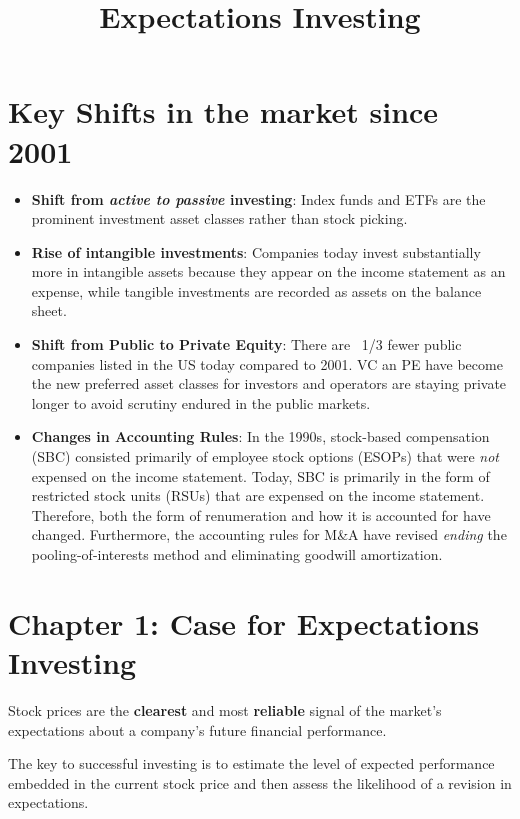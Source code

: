 \documentclass[english,titlepage]{article}
\begin{document}
\title{\textbf{Expectations Investing} \\ 
\date{}
}
\maketitle
\section{Key Shifts in the market since 2001}
\begin{itemize}
    \item \textbf{Shift from \emph{active to passive} investing}: Index funds and ETFs are the prominent investment asset classes rather than stock picking. 
    \item \textbf{Rise of intangible investments}: Companies today invest substantially more in intangible assets because they appear on the income statement as an expense, while tangible investments are recorded as assets on the balance sheet. 
    \item \textbf{Shift from Public to Private Equity}: There are ~1/3 fewer public companies listed in the US today compared to 2001. VC an PE have become the new preferred asset classes for investors and operators are staying private longer to avoid scrutiny endured in the public markets. 
    \item \textbf{Changes in Accounting Rules}: In the 1990s, stock-based compensation (SBC) consisted primarily of employee stock options (ESOPs) that were \emph{not} expensed on the income statement. 
                                                Today, SBC is primarily in the form of restricted stock units (RSUs) that are expensed on the income statement. 
                                                Therefore, both the form of renumeration and how it is accounted for have changed. Furthermore, the accounting rules for M\&A have revised \emph{ending} the pooling-of-interests method and eliminating goodwill amortization. 
\end{itemize}
\section{Chapter 1: Case for Expectations Investing}
Stock prices are the \textbf{clearest} and most \textbf{reliable} signal of the market's expectations about a company's future financial performance. 
\begin{tcolorbox}[colback=blue!5!white,colframe=blue!75!black]
    The key to successful investing is to estimate the level of expected performance embedded in the current stock price and then assess the likelihood of a revision in expectations. 
\end{tcolorbox}
\end{document}
